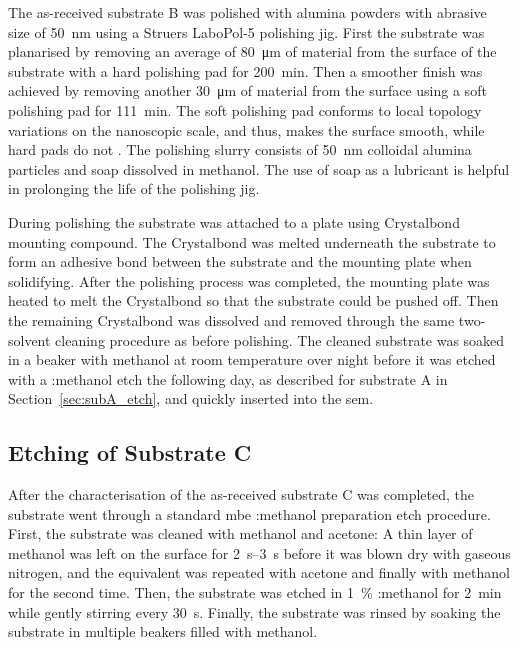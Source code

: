 The as-received substrate B was polished with alumina powders with abrasive size of \SI{50}{\nano\metre} using a Struers LaboPol-5 polishing jig. First the substrate was planarised by removing an average of \SI{80}{\micro\metre} of material from the surface of the substrate with a hard polishing pad for \SI{200}{\minute}. Then a smoother finish was achieved by removing another \SI{30}{\micro\metre} of material from the surface using a soft polishing pad for \SI{111}{\minute}. The soft polishing pad conforms to local topology variations on the nanoscopic scale, and thus, makes the surface smooth, while hard pads do not \citep{lee2000nanotopography}. The polishing slurry consists of \SI{50}{\nano\metre} colloidal alumina particles and soap dissolved in methanol. The use of soap as a lubricant is helpful in prolonging the life of the polishing jig.

During polishing the substrate was attached to a plate using Crystalbond mounting compound. The Crystalbond was melted underneath the substrate to form an adhesive bond between the substrate and the mounting plate when solidifying. After the polishing process was completed, the mounting plate was heated to melt the Crystalbond so that the substrate could be pushed off. Then the remaining Crystalbond was dissolved and removed through the same two-solvent cleaning procedure as before polishing. The cleaned substrate was soaked in a beaker with methanol at room temperature over night before it was etched with a :methanol etch the following day, as described for substrate A in Section~\ref{sec:subA_etch}, and quickly inserted into the \ac{sem}.

\subsection{Etching of Substrate C}

After the characterisation of the as-received substrate C was completed, the substrate went through a standard \ac{mbe} :methanol preparation etch procedure. First, the substrate was cleaned with methanol and acetone: A thin layer of methanol was left on the surface for \SIrange{2}{3}{\second} before it was blown dry with gaseous nitrogen, and the equivalent was repeated with acetone and finally with methanol for the second time. Then, the substrate was etched in \SI{1}{\percent} :methanol for \SI{2}{\minute} while gently stirring every \SI{30}{\second}. Finally, the substrate was rinsed by soaking the substrate in multiple beakers filled with methanol.

